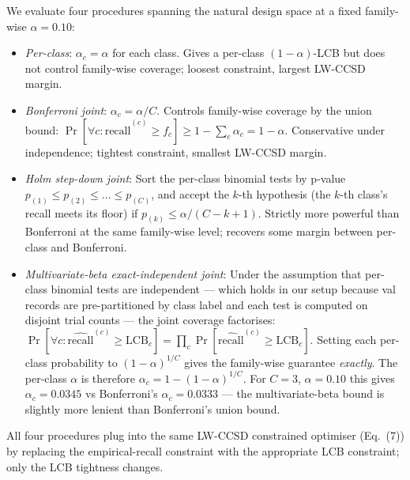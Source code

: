 \documentclass[journal]{IEEEtran}
\begin{document}
We evaluate four procedures spanning the natural design space at a fixed family-wise $\alpha = 0.10$:
\begin{itemize}
\item \emph{Per-class}: $\alpha_c = \alpha$ for each class. Gives a per-class $(1 - \alpha)$-LCB but does not control family-wise coverage; loosest constraint, largest LW-CCSD margin.
\item \emph{Bonferroni joint}: $\alpha_c = \alpha / C$. Controls family-wise coverage by the union bound: $\Pr[\forall c: \widehat{\mathrm{recall}}^{(c)} \geq f_c] \geq 1 - \sum_c \alpha_c = 1 - \alpha$. Conservative under independence; tightest constraint, smallest LW-CCSD margin.
\item \emph{Holm step-down joint}: Sort the per-class binomial tests by p-value $p_{(1)} \leq p_{(2)} \leq \dots \leq p_{(C)}$, and accept the $k$-th hypothesis (the $k$-th class's recall meets its floor) if $p_{(k)} \leq \alpha / (C - k + 1)$. Strictly more powerful than Bonferroni at the same family-wise level; recovers some margin between per-class and Bonferroni.
\item \emph{Multivariate-beta exact-independent joint}: Under the assumption that per-class binomial tests are independent --- which holds in our setup because val records are pre-partitioned by class label and each test is computed on disjoint trial counts --- the joint coverage factorises: $\Pr[\forall c: \widehat{\mathrm{recall}}^{(c)} \geq \mathrm{LCB}_c] = \prod_c \Pr[\widehat{\mathrm{recall}}^{(c)} \geq \mathrm{LCB}_c]$. Setting each per-class probability to $(1 - \alpha)^{1/C}$ gives the family-wise guarantee \emph{exactly}. The per-class $\alpha$ is therefore $\alpha_c = 1 - (1 - \alpha)^{1/C}$. For $C = 3$, $\alpha = 0.10$ this gives $\alpha_c = 0.0345$ vs Bonferroni's $\alpha_c = 0.0333$ --- the multivariate-beta bound is slightly more lenient than Bonferroni's union bound.
\end{itemize}

All four procedures plug into the same LW-CCSD constrained optimiser (Eq.~(7)) by replacing the empirical-recall constraint with the appropriate LCB constraint; only the LCB tightness changes.
\end{document}
